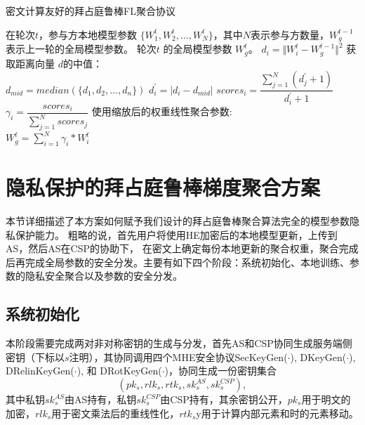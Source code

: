 \begin{algorithm}[htbp]
	\caption{密文计算友好的拜占庭鲁棒FL聚合协议}
	\label{a0}
	\begin{algorithmic}[1]
		\REQUIRE 在轮次$t$，参与方本地模型参数 $\{W_1^t, W_2^t, ..., W_N^t\}$，其中$N$表示参与方数量，$W_g^{t-1}$ 表示上一轮的全局模型参数。
		\ENSURE 轮次$t$ 的全局模型参数 $W_g^t$。 
		\STATE ${d}_i = \Vert W_i^t - W_g^{t-1} \Vert ^2$
		\ENDFOR
		\STATE 获取距离向量 ${d}$的中值：\\${d}_{mid} = median(\{{d}_{1}, {d}_{2},..., {d}_{n}\})$
		\STATE $d^{\prime}_{i}=\left|d_i-d_{mid}\right|$
		\ENDFOR
	\STATE $scores_i=\dfrac{\sum_{j=1}^{N} (d^{\prime}_{j} + 1)}{d^{\prime}_i + 1}$ 
	\ENDFOR
	\STATE $\gamma_i=\dfrac{scores_i}{\sum_{j=1}^{N} scores_j}$
	\ENDFOR
	\STATE 使用缩放后的权重线性聚合参数:\\
	$W_g^{t} =\sum_{i=1}^{N}\gamma_i * W_i^{t}$
\end{algorithmic}
\end{algorithm}

\section{隐私保护的拜占庭鲁棒梯度聚合方案}\label{PBFL}
本节详细描述了本方案如何赋予我们设计的拜占庭鲁棒聚合算法完全的模型参数隐私保护能力。
粗略的说，首先用户将使用HE加密后的本地模型更新，上传到AS，然后AS在CSP的协助下，
在密文上确定每份本地更新的聚合权重，聚合完成后再完成全局参数的安全分发。主要有如下四个阶段：系统初始化、本地训练、参数的隐私安全聚合以及参数的安全分发。

\subsection{系统初始化}
本阶段需要完成两对非对称密钥的生成与分发，首先AS和CSP协同生成服务端侧密钥（下标以$ s $注明），其协同调用四个MHE安全协议SecKeyGen($\cdot$), DKeyGen($\cdot$), DRelinKeyGen($\cdot$), 和 DRotKeyGen($\cdot$)，协同生成一份密钥集合$$ (pk_s, rlk_s, rtk_s, sk_{s}^{AS}, sk_{s}^{CSP}),$$其中私钥$ sk_{s}^{AS} $由AS持有，私钥$ sk_{s}^{CSP} $由CSP持有，其余密钥公开，$ pk_s $用于明文的加密，$ rlk_s $用于密文乘法后的重线性化，$ rtk_s $y用于计算内部元素和时的元素移动。

